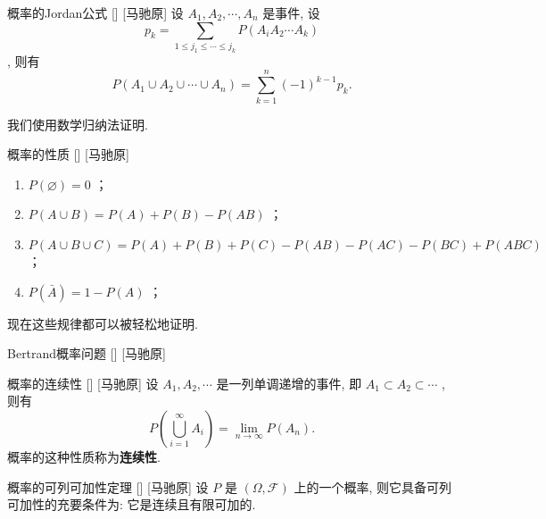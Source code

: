 \documentclass[UTF8]{ctexart}
\begin{document}
        \begin{thm}
            []
            {概率的Jordan公式}
            []
            [马驰原]
            设 \(A_1,A_2,\cdots,A_n\) 是事件, 设\[p_k=\sum_{1\leq j_1\leq\cdots\leq j_k  }P(A_iA_2\cdots A_k)\], 则有
            \[P(A_1\cup A_2\cup\cdots\cup A_n)=\sum_{k=1}^{n}(-1)^{k-1}p_k.\]
        \end{thm}

        \begin{prf}
            
            
            
            
            我们使用数学归纳法证明. 


        \end{prf}

        \begin{ppt}
            []
            {概率的性质}
            []
            [马驰原]
            \begin{enumerate}
                \item  \(P(\varnothing)=0\) ；
                \item  \(P(A\cup B)=P(A)+P(B)-P(AB)\) ；
                \item  \(P(A\cup B\cup C)=P(A)+P(B)+P(C)-P(AB)-P(AC)-P(BC)+P(ABC)\) ；
                \item  \(P(\bar{A})=1-P(A)\) ；
            \end{enumerate}
        \end{ppt}

        现在这些规律都可以被轻松地证明. 

        \begin{cxmp}
            []
            {Bertrand概率问题}
            []
            [马驰原]
        \end{cxmp}

        \begin{dfn}
            []
            {概率的连续性}
            []
            [马驰原]
            设 \(A_1,A_2,\cdots\) 是一列单调递增的事件, 即 \(A_1\subset A_2\subset\cdots\) , 则有\[P\left(\bigcup_{i=1}^{\infty}A_i\right)=\lim_{n\to\infty}P(A_n).\]概率的这种性质称为\textbf{连续性}. 
        \end{dfn}
        
        \begin{thm}
            []
            {概率的可列可加性定理}
            []
            [马驰原]
            设 \(P\) 是 \((\Omega,\mathcal{F})\) 上的一个概率, 则它具备可列可加性的充要条件为: 它是连续且有限可加的. 
        \end{thm}
\end{document}
